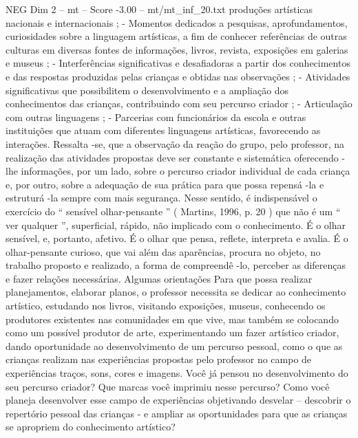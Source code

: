 \begin{textsample}{NEG Dim 2 – mt – Score -3.00 – mt/mt\_inf\_20.txt}
produções artísticas nacionais e internacionais ; - Momentos dedicados a pesquisas, aprofundamentos, curiosidades sobre a linguagem artísticas, a fim de conhecer referências de outras culturas em diversas fontes de informações, livros, revista, exposições em galerias e museus ; - Interferências significativas e desafiadoras a partir dos conhecimentos e das respostas produzidas pelas crianças e obtidas nas observações ; - Atividades significativas que possibilitem o desenvolvimento e a ampliação dos conhecimentos das crianças, contribuindo com seu percurso criador ; - Articulação com outras linguagens ; - Parcerias com funcionários da escola e outras instituições que atuam com diferentes linguagens artísticas, favorecendo as interações.
Ressalta -se, que a observação da reação do grupo, pelo professor, na realização das atividades propostas deve ser constante e sistemática oferecendo -lhe informações, por um lado, sobre o percurso criador individual de cada criança e, por outro, sobre a adequação de sua prática para que possa repensá -la e estruturá -la sempre com mais segurança.
Nesse sentido, é indispensável o exercício do “ sensível olhar-pensante ” ( Martins, 1996, p. 20 ) que não é um “ ver qualquer ”, superficial, rápido, não implicado com o conhecimento.
É o olhar sensível, e, portanto, afetivo.
É o olhar que pensa, reflete, interpreta e avalia.
É o olhar-pensante curioso, que vai além das aparências, procura no objeto, no trabalho proposto e realizado, a forma de compreendê -lo, perceber as diferenças e fazer relações necessárias.
Algumas orientações Para que possa realizar planejamentos, elaborar planos, o professor necessita se dedicar ao conhecimento artístico, estudando nos livros, visitando exposições, museus, conhecendo os produtores existentes nas comunidades em que vive, mas também se colocando como um possível produtor de arte, experimentando um fazer artístico criador, dando oportunidade ao desenvolvimento de um percurso pessoal, como o que as crianças realizam nas experiências propostas pelo professor no campo de experiências traços, sons, cores e imagens.
Você já pensou no desenvolvimento do seu percurso criador?
Que marcas você imprimiu nesse percurso?
Como você planeja desenvolver esse campo de experiências objetivando desvelar – descobrir o repertório pessoal das crianças - e ampliar as oportunidades para que as crianças se apropriem do conhecimento artístico?

\end{textsample}
